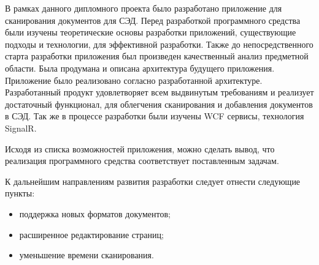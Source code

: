 
В рамках данного дипломного проекта было разработано приложение для сканирования документов для СЭД. Перед разработкой программного средства были изучены теоретические основы разработки приложений, существующие подходы и технологии, для эффективной разработки. Также до непосредственного старта разработки приложения был произведен качественный анализ предметной области. Была продумана и описана архитектура будущего приложения. Приложение было реализовано согласно разработанной архитектуре. Разработанный продукт удовлетворяет всем выдвинутым требованиям и реализует достаточный функционал, для облегчения сканирования и добавления документов в СЭД. Так же в процессе разработки были изучены WCF сервисы, технология SignalR.

Исходя из списка возможностей приложения, можно сделать вывод, что реализация программного средства соответствует поставленным задачам.

К дальнейшим направлениям развития разработки следует отнести следующие пункты:
\begin{itemize}
	\item поддержка новых форматов документов;
	\item расширенное редактирование страниц;
	\item уменьшение времени сканирования.
\end{itemize}